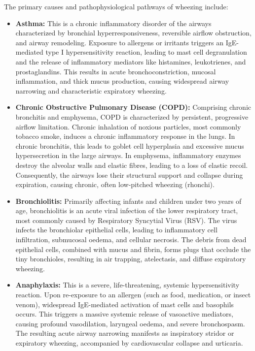The primary causes and pathophysiological pathways of wheezing include:
\begin{itemize}
    \item \textbf{Asthma:} This is a chronic inflammatory disorder of the airways characterized by bronchial hyperresponsiveness, reversible airflow obstruction, and airway remodeling. Exposure to allergens or irritants triggers an IgE-mediated type I hypersensitivity reaction, leading to mast cell degranulation and the release of inflammatory mediators like histamines, leukotrienes, and prostaglandins. This results in acute bronchoconstriction, mucosal inflammation, and thick mucus production, causing widespread airway narrowing and characteristic expiratory wheezing.
    \item \textbf{Chronic Obstructive Pulmonary Disease (COPD):} Comprising chronic bronchitis and emphysema, COPD is characterized by persistent, progressive airflow limitation. Chronic inhalation of noxious particles, most commonly tobacco smoke, induces a chronic inflammatory response in the lungs. In chronic bronchitis, this leads to goblet cell hyperplasia and excessive mucus hypersecretion in the large airways. In emphysema, inflammatory enzymes destroy the alveolar walls and elastic fibres, leading to a loss of elastic recoil. Consequently, the airways lose their structural support and collapse during expiration, causing chronic, often low-pitched wheezing (rhonchi).
    \item \textbf{Bronchiolitis:} Primarily affecting infants and children under two years of age, bronchiolitis is an acute viral infection of the lower respiratory tract, most commonly caused by Respiratory Syncytial Virus (RSV). The virus infects the bronchiolar epithelial cells, leading to inflammatory cell infiltration, submucosal oedema, and cellular necrosis. The debris from dead epithelial cells, combined with mucus and fibrin, forms plugs that occlude the tiny bronchioles, resulting in air trapping, atelectasis, and diffuse expiratory wheezing.
    \item \textbf{Anaphylaxis:} This is a severe, life-threatening, systemic hypersensitivity reaction. Upon re-exposure to an allergen (such as food, medication, or insect venom), widespread IgE-mediated activation of mast cells and basophils occurs. This triggers a massive systemic release of vasoactive mediators, causing profound vasodilation, laryngeal oedema, and severe bronchospasm. The resulting acute airway narrowing manifests as inspiratory stridor or expiratory wheezing, accompanied by cardiovascular collapse and urticaria.

\end{itemize}
